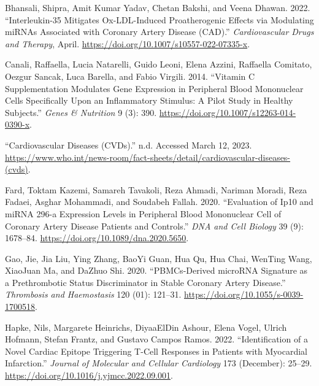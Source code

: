 \documentclass[
]{article}
\newlength{\cslhangindent}
\newlength{\cslentryspacingunit} %
\newenvironment{CSLReferences}[2] %
 {%
  \setlength{\parindent}{0pt}
  \ifodd #1
  \let\oldpar\par
  \def\par{\hangindent=\cslhangindent\oldpar}
  \fi
  \setlength{\parskip}{#2\cslentryspacingunit}
 }%
 {}
\begin{document}
\hypertarget{refs}{}
\begin{CSLReferences}{1}{0}
\leavevmode{}%
Bhansali, Shipra, Amit Kumar Yadav, Chetan Bakshi, and Veena Dhawan.
2022. {``Interleukin-35 {Mitigates} Ox-{LDL}-{Induced} {Proatherogenic}
{Effects} via {Modulating} {miRNAs} {Associated} with {Coronary}
{Artery} {Disease} ({CAD}).''} \emph{Cardiovascular Drugs and Therapy},
April. \url{https://doi.org/10.1007/s10557-022-07335-x}.

\leavevmode{}%
Canali, Raffaella, Lucia Natarelli, Guido Leoni, Elena Azzini, Raffaella
Comitato, Oezgur Sancak, Luca Barella, and Fabio Virgili. 2014.
{``Vitamin {C} Supplementation Modulates Gene Expression in Peripheral
Blood Mononuclear Cells Specifically Upon an Inflammatory Stimulus: A
Pilot Study in Healthy Subjects.''} \emph{Genes \& Nutrition} 9 (3):
390. \url{https://doi.org/10.1007/s12263-014-0390-x}.

\leavevmode{}%
{``Cardiovascular Diseases ({CVDs}).''} n.d. Accessed March 12, 2023.
\url{https://www.who.int/news-room/fact-sheets/detail/cardiovascular-diseases-(cvds)}.

\leavevmode{}%
Fard, Toktam Kazemi, Samareh Tavakoli, Reza Ahmadi, Nariman Moradi, Reza
Fadaei, Asghar Mohammadi, and Soudabeh Fallah. 2020. {``Evaluation of
{Ip10} and {miRNA} 296-a {Expression} {Levels} in {Peripheral} {Blood}
{Mononuclear} {Cell} of {Coronary} {Artery} {Disease} {Patients} and
{Controls}.''} \emph{DNA and Cell Biology} 39 (9): 1678--84.
\url{https://doi.org/10.1089/dna.2020.5650}.

\leavevmode{}%
Gao, Jie, Jia Liu, Ying Zhang, BaoYi Guan, Hua Qu, Hua Chai, WenTing
Wang, XiaoJuan Ma, and DaZhuo Shi. 2020. {``{PBMCs}-{Derived} {microRNA}
{Signature} as a {Prethrombotic} {Status} {Discriminator} in {Stable}
{Coronary} {Artery} {Disease}.''} \emph{Thrombosis and Haemostasis} 120
(01): 121--31. \url{https://doi.org/10.1055/s-0039-1700518}.

\leavevmode{}%
Hapke, Nils, Margarete Heinrichs, DiyaaElDin Ashour, Elena Vogel, Ulrich
Hofmann, Stefan Frantz, and Gustavo Campos Ramos. 2022.
{``Identification of a Novel Cardiac Epitope Triggering {T}-Cell
Responses in Patients with Myocardial Infarction.''} \emph{Journal of
Molecular and Cellular Cardiology} 173 (December): 25--29.
\url{https://doi.org/10.1016/j.yjmcc.2022.09.001}.


\end{CSLReferences}
\end{document}
